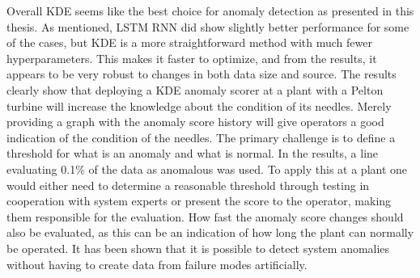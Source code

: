    Overall KDE seems like the best choice for anomaly detection as presented in this thesis. As mentioned, LSTM RNN did show slightly better performance for some of the cases, but KDE is a more straightforward method with much fewer hyperparameters. This makes it faster to optimize, and from the results, it appears to be very robust to changes in both data size and source. The results clearly show that deploying a KDE anomaly scorer at a plant with a Pelton turbine will increase the knowledge about the condition of its needles. Merely providing a graph with the anomaly score history will give operators a good indication of the condition of the needles. The primary challenge is to define a threshold for what is an anomaly and what is normal. In the results, a line evaluating 0.1\% of the data as anomalous was used. To apply this at a plant one would either need to determine a reasonable threshold through testing in cooperation with system experts or present the score to the operator, making them responsible for the evaluation. How fast the anomaly score changes should also be evaluated, as this can be an indication of how long the plant can normally be operated. It has been shown that it is possible to detect system anomalies without having to create data from failure modes artificially.    


    
    
    

    
    
    
    
    
